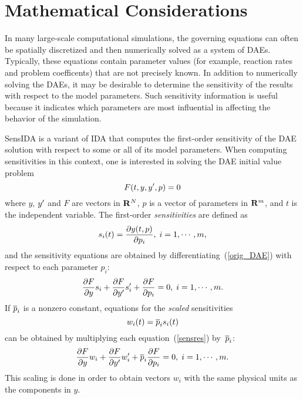 \section{Mathematical Considerations}

In many large-scale computational simulations, the governing equations
can often be spatially discretized and then numerically solved as a
system of DAEs.
Typically, these equations contain parameter values (for example,
reaction rates and problem coefficents) that are not precisely known.
In addition to numerically solving the DAEs, it may be desirable to
determine the sensitivity of the results with respect to the model
parameters.
Such sensitivity information is useful because it indicates which
parameters are most influential in affecting the behavior of the
simulation.
	
SensIDA is a variant of IDA that computes the first-order sensitivity
of the DAE solution with respect to some or all of its model
parameters.
When computing sensitivities in this context, one is interested in
solving the DAE initial value problem
\begin{equation}
F(t, y, y^{\prime}, p)=0 \label{orig_DAE}
\end{equation}
where $y$, $y^{\prime}$ and $F$ are vectors in ${\bf R}^N$, 
$p$ is a vector of parameters in ${\bf R}^m$, and
$t$ is the independent variable.
The first-order {\em sensitivities} are defined as
\[
s_{i}(t) = \frac{\partial y(t,p)}{\partial p_i}, \; i = 1,\cdots, m,
\]
and the sensitivity equations are obtained by
differentiating~(\ref{orig_DAE}) with respect to each parameter $p_i$:
\begin{equation}
\frac{\partial F}{\partial y}s_i + \frac{\partial F}{\partial
y^{\prime}}s_{i}^{\prime} + \frac{\partial F}{\partial p_i} = 0, \; 
i = 1,\cdots, m. \label{sensres}
\end{equation}
If $\overline{p}_i$ is a nonzero constant, equations for the {\em scaled}
sensitivities
\begin{equation}
w_i(t) = \overline{p}_i s_i(t)
\end{equation}
can be obtained by multiplying each equation~(\ref{sensres})
by~$\overline{p}_i$:
\begin{equation}
\frac{\partial F}{\partial y}w_i + \frac{\partial F}{\partial
y^{\prime}}w_{i}^{\prime} + \overline{p}_i \frac{\partial F}{\partial p_i} = 0, \; 
i = 1,\cdots, m. \label{scaledsensres}
\end{equation}
This scaling is done in order to obtain vectors $w_i$ with the same
physical units as the components in $y$.

